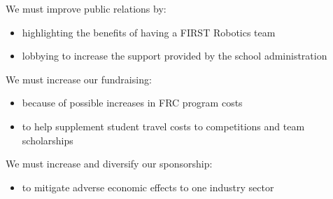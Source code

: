 We must improve public relations by:
\begin{itemize}
	\item highlighting the benefits of having a FIRST Robotics team
	\item lobbying to increase the support provided by the school administration
\end{itemize}

We must increase our fundraising:
\begin{itemize}
	\item because of possible increases in FRC program costs
	\item to help supplement student travel costs to competitions and team scholarships
\end{itemize}

We must increase and diversify our sponsorship:
\begin{itemize}
	\item to mitigate adverse economic effects to one industry sector 
\end{itemize}

\newpage

